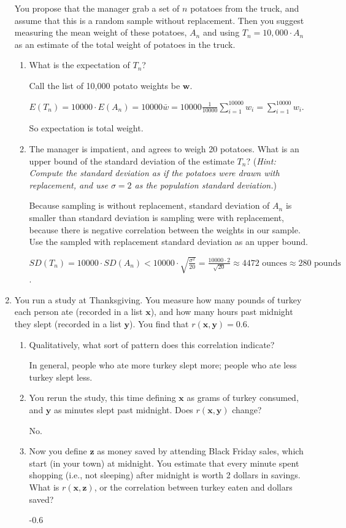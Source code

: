 \documentclass[11pt]{article}
\begin{document}
\begin{enumerate}
You propose that the manager grab a set of $n$ potatoes from the truck, and assume that this is a random sample without replacement. Then you suggest measuring the mean weight of these potatoes, $A_n$ and using $T_n = 10,000 \cdot A_n$ as an estimate of the total weight of potatoes in the truck.

\begin{enumerate}
\item What is the expectation of $T_n$?

{\color{red} Call the list of 10,000 potato weights be $\bm w$.

$E(T_n) = 10000 \cdot E(A_n) = 10000 \bar w = 10000 \frac{1}{10000} \sum_{i=1}^{10000} w_i = \sum_{i=1}^{10000} w_i$.

So expectation is total weight.}
\item The manager is impatient, and agrees to weigh 20 potatoes. What is an upper bound of the standard deviation of the estimate $T_n$? (\emph{Hint: Compute the standard deviation as if the potatoes were drawn with replacement, and use $\sigma = 2$ as the population standard deviation.})
{\color{red}
Because sampling is without replacement, standard deviation of $A_n$ is smaller than standard deviation is sampling were with replacement, because there is negative correlation between the weights in our sample. Use the sampled with replacement standard deviation as an upper bound.

$SD(T_n) = 10000 \cdot SD(A_n) < 10000 \cdot \sqrt{\frac{\sigma^2}{20}} = \frac{10000 \cdot 2}{\sqrt{20}} \approx 4472 \textrm{ ounces} \approx 280 \textrm{ pounds}$.}
\end{enumerate}

\item You run a study at Thanksgiving. You measure how many pounds of turkey each person ate (recorded in a list $\bm x$), and how many hours past midnight they slept (recorded in a list $\bm y$). You find that $r(\bm x, \bm y) = 0.6$.
\begin{enumerate}
\item Qualitatively, what sort of pattern does this correlation indicate?

{\color{red}
  In general, people who ate more turkey slept more; people who ate less turkey slept less.   
}
\item You rerun the study, this time defining $\bm x$ as grams of turkey consumed, and $\bm y$ as minutes slept past midnight. Does $r(\bm x, \bm y)$ change?

{\color{red} No.}

\item Now you define $\bm z$ as money saved by attending Black Friday sales, which start (in your town) at midnight. You estimate that every minute spent shopping (i.e., not sleeping) after midnight is worth 2 dollars in savings. What is $r(\bm x, \bm z)$, or the correlation between turkey eaten and dollars saved?

{\color{red} -0.6}
\end{enumerate}
\end{enumerate}
\end{document}
